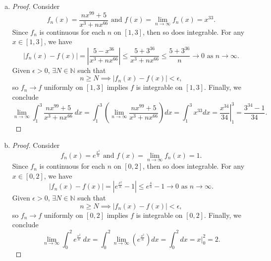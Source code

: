 \begin{Exercise}
\begin{enumerate}[a)]
\item 
\begin{proof}
Consider $$f_n(x) = \frac{n x^{99}+5}{x^3+n x^{66}}\text{ and } f(x)=\lim_{n\to\infty}f_n(x) = x^{33}.$$
Since $f_n$ is continuous for each $n$ on $[1,3]$, then so does integrable.
For any $x\in[1, 3]$, we have $$ \left| f_n(x) - f(x) \right| =
\left| \frac{5-x^{36}}{x^3+n x^{66}} \right| \leq
\frac{5+3^{36}}{x^3+n x^{66}} \leq
\frac{5+3^{36}}{n}\to0 \mbox{ as } n\to\infty.$$
Given $\epsilon > 0$, $\exists N\in\mathbb{N}$ such that $$n \geq N \implies \left| f_n(x) - f(x) \right| < \epsilon,$$
so $f_n \to f$ uniformly on $[1,3]$ implies $f$ is integrable on $[1,3]$. Finally, we conclude $$\lim_{n\to\infty}\int_{1}^{3} \frac{n x^{99}+5}{x^3+n x^{66}}\ dx =
\int_{1}^{3}\left( \lim_{n\to\infty}\frac{n x^{99}+5}{x^3+n x^{66}}\right)dx =
\int_{1}^{3}x^{33} dx =
\left. \frac{x^{34}}{34} \right|_{1}^{3} =
\frac{3^{34}-1}{34}.$$ 
\end{proof}

\item
\begin{proof}
Consider $$f_n(x) = e^{\frac{x^2}{n}}\text{ and } f(x)=\lim_{n\to\infty}f_n(x) = 1.$$
Since $f_n$ is continuous for each $n$ on $[0,2]$, then so does integrable.
For any $x\in[0, 2]$, we have $$ \left| f_n(x) - f(x) \right| =
\left| e^{\frac{x^2}{n}}-1 \right| \leq
e^{\frac{4}{n}}-1\to 0\mbox{ as } n\to\infty.$$
Given $\epsilon > 0$, $\exists N\in\mathbb{N}$ such that $$n \geq N \implies \left| f_n(x) - f(x) \right| < \epsilon,$$
so $f_n \to f$ uniformly on $[0,2]$ implies $f$ is integrable on $[0,2]$. Finally, we conclude $$\lim_{n\to\infty}\int_{0}^{2} e^{\frac{x^2}{n}}\ dx =
\int_{0}^{2} \lim_{n\to\infty}\left( e^{\frac{x^2}{n} }\right) dx =
\int_{0}^{2} dx =
\left. x \right|_{0}^{2} =
2.$$
\end{proof}


\end{enumerate}
\end{Exercise}
